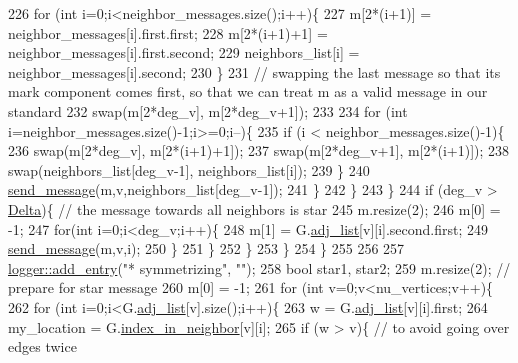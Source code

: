 \begin{DoxyCode}
226             \textcolor{keywordflow}{for} (\textcolor{keywordtype}{int} i=0;i<neighbor\_messages.size();i++)\{
227               m[2*(i+1)]   = neighbor\_messages[i].first.first;
228               m[2*(i+1)+1] = neighbor\_messages[i].first.second;
229               neighbors\_list[i] = neighbor\_messages[i].second;
230             \}
231             \textcolor{comment}{// swapping the last message so that its mark component comes first, so that we can treat m as
       a valid message in our standard}
232             swap(m[2*deg\_v], m[2*deg\_v+1]);
233 
234             \textcolor{keywordflow}{for} (\textcolor{keywordtype}{int} i=neighbor\_messages.size()-1;i>=0;i--)\{
235               \textcolor{keywordflow}{if} (i < neighbor\_messages.size()-1)\{
236                 swap(m[2*deg\_v], m[2*(i+1)+1]);
237                 swap(m[2*deg\_v+1], m[2*(i+1)]);
238                 swap(neighbors\_list[deg\_v-1], neighbors\_list[i]);
239               \}
240               \hyperlink{classgraph__message_aa76d1d5420a12477fa1dddd878d78c8f}{send\_message}(m,v,neighbors\_list[deg\_v-1]);
241             \}
242           \}
243         \}
244         \textcolor{keywordflow}{if} (deg\_v > \hyperlink{classgraph__message_a45dfd061b7bc73572e5132fbf66efd55}{Delta})\{ \textcolor{comment}{// the message towards all neighbors is star}
245           m.resize(2);
246           m[0] = -1;
247           \textcolor{keywordflow}{for}(\textcolor{keywordtype}{int} i=0;i<deg\_v;i++)\{
248             m[1] = G.\hyperlink{classmarked__graph_a1a0bf7ca413a278763f7c878b3b6fd6f}{adj\_list}[v][i].second.first;
249             \hyperlink{classgraph__message_aa76d1d5420a12477fa1dddd878d78c8f}{send\_message}(m,v,i);
250           \}
251         \}
252       \}
253     \}
254   \}
255 
256 
257   \hyperlink{classlogger_a710163deb17bc81f70d53d285b8ac9ac}{logger::add\_entry}(\textcolor{stringliteral}{"* symmetrizing"}, \textcolor{stringliteral}{""});
258   \textcolor{keywordtype}{bool} star1, star2;
259   m.resize(2); \textcolor{comment}{// prepare for star message}
260   m[0] = -1;
261   \textcolor{keywordflow}{for} (\textcolor{keywordtype}{int} v=0;v<nu\_vertices;v++)\{
262     \textcolor{keywordflow}{for} (\textcolor{keywordtype}{int} i=0;i<G.\hyperlink{classmarked__graph_a1a0bf7ca413a278763f7c878b3b6fd6f}{adj\_list}[v].size();i++)\{
263       w = G.\hyperlink{classmarked__graph_a1a0bf7ca413a278763f7c878b3b6fd6f}{adj\_list}[v][i].first;
264       my\_location = G.\hyperlink{classmarked__graph_aee10b537408de42476609c1e45c075d0}{index\_in\_neighbor}[v][i];
265       \textcolor{keywordflow}{if} (w > v)\{ \textcolor{comment}{// to avoid going over edges twice }

\end{DoxyCode}
